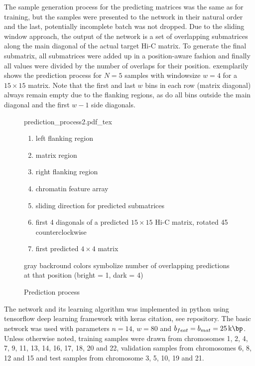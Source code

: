 The sample generation process for the predicting matrices was the same as for training,
but the samples were presented to the network in their natural order
and the last, potentially incomplete batch was not dropped.
Due to the sliding window approach, the output of the network is a set of overlapping submatrices along the main diagonal of the actual target Hi-C matrix.
To generate the final submatrix, all submatrices were added up in a position-aware fashion 
and finally all values were divided by the number of overlaps for their position.
 exemplarily shows the prediction process for $N=5$ samples with windowsize $w=4$ for a $15\times15$ matrix.
Note that the first and last $w$ bins in each row (matrix diagonal) always remain empty due to the flanking regions,
as do all bins outside the main diagonal and the first $w-1$ side diagonals.
\begin{figure}
 \begin{minipage}{0.60\textwidth}
   \centering
    \small
    {prediction_process2.pdf_tex}
    \caption{Prediction process}
    \label{fig:methods:prediction}
 \end{minipage}\hfill
 \begin{minipage}{0.3\textwidth}
 \scriptsize
  \begin{enumerate}[label=\Alph*:,leftmargin=*]
   \raggedright
    \item left flanking region
    \item matrix region
    \item right flanking region
    \item chromatin feature array
    \item sliding direction for predicted submatrices
    \item first 4 diagonals of a predicted $15\times15$ Hi-C matrix, rotated \SI{45}{\deg} counterclockwise
    \item first predicted $4\times4$ matrix
\end{enumerate}
\raggedright{gray backround colors symbolize number of overlapping predictions at that position (bright = 1, dark = 4)}
 \end{minipage}
\end{figure}

The network and its learning algorithm was implemented in python using tensorflow deep learning framework with keras \xxx citation, see \xxx repository.
The basic network was used with parameters $n=14$, $w=80$ and $b_{feat}=b_{mat} = \SI{25}{\kilo\bp}$. 
Unless otherwise noted, training samples were drawn from chromosomes 1, 2, 4, 7, 9, 11, 13, 14, 16, 17, 18, 20 and 22, 
validation samples from chromosomes 6, 8, 12 and 15 and test samples from chromosome 3, 5, 10, 19 and 21.

